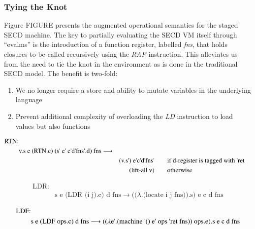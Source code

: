 \documentclass[fleqn]{article}
\theoremstyle{definition}
\newcommand{\ts}{\textquotesingle}
\begin{document}
\subsubsection{Tying the Knot}
Figure FIGURE presents the augmented operational semantics for the staged SECD machine. The key to partially evaluating the SECD VM itself through ``evalms'' is the introduction of a function register, labelled \textit{fns}, that holds closures to-be-called recursively using the \textit{RAP} instruction. This alleviates us from the need to tie the knot in the environment as is done in the traditional SECD model. The benefit is two-fold:
\begin{enumerate}
	\item We no longer require a store and ability to mutate variables in the underlying language
	\item Prevent additional complexity of overloading the \textit{LD} instruction to load values but also functions
\end{enumerate}

\begin{alignat*}{3}
		\text{RTN:} &																																							\\
		& \text{v.s e (RTN.c) (s{\ts} e{\ts} c\ts  d\ts  fns\ts.d) fns} \longrightarrow &&							\\
		&& \text{(v.s\ts)  e\ts  c\ts  d\ts  fns\ts} \quad	&&& \text{if d-register is tagged with {\ts}ret} 	\\
		&& \text{(lift-all v)}									 \quad &&& \text{otherwise}
\end{alignat*}

\begin{equation*}
	\begin{split}
		\text{LDR:} & \\
		& \text{s e (LDR (i j).c) d fns} \longrightarrow \text{(($\lambda$.(locate i j fns)).s) e c d fns}
	\end{split}
\end{equation*}

\begin{equation*}
	\begin{split}
		\text{LDF:} & \\
		& \text{s e (LDF ops.c) d fns} \longrightarrow \text{(($\lambda$e{\ts}.(machine {\ts}() e{\ts} ops {\ts}ret fns)) ops.e).s e c d fns}
	\end{split}
\end{equation*}
\end{document}
